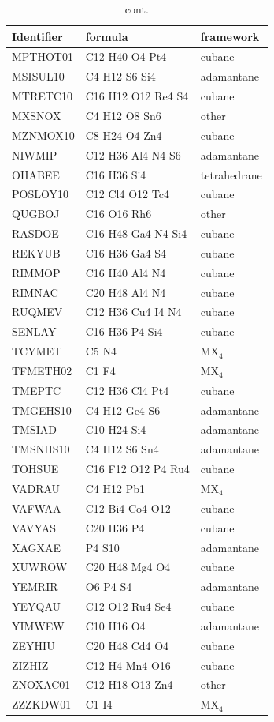 \documentclass[preprint]{revtex4}              %
\begin{document}
\begin{table}
\caption{cont.}\tiny
\begin{tabular}{lll}
Identifier & formula & framework\\
\hline
MPTHOT01 & C12 H40 O4 Pt4 & cubane \\
MSISUL10 & C4 H12 S6 Si4 & adamantane\\
MTRETC10 & C16 H12 O12 Re4 S4 & cubane\\
MXSNOX & C4 H12 O8 Sn6 & other\\
MZNMOX10 & C8 H24 O4 Zn4 & cubane\\
NIWMIP & C12 H36 Al4 N4 S6 & adamantane\\
OHABEE & C16 H36 Si4 & tetrahedrane\\
POSLOY10 & C12 Cl4 O12 Tc4 & cubane\\
QUGBOJ & C16 O16 Rh6 & other\\
RASDOE & C16 H48 Ga4 N4 Si4 & cubane\\
REKYUB & C16 H36 Ga4 S4 & cubane\\
RIMMOP & C16 H40 Al4 N4 & cubane\\
RIMNAC & C20 H48 Al4 N4 & cubane\\
RUQMEV & C12 H36 Cu4 I4 N4 & cubane\\
SENLAY & C16 H36 P4 Si4 & cubane\\
TCYMET & C5 N4 & MX$_4$\\
TFMETH02 & C1 F4 & MX$_4$\\
TMEPTC & C12 H36 Cl4 Pt4 & cubane\\
TMGEHS10 & C4 H12 Ge4 S6 & adamantane\\
TMSIAD & C10 H24 Si4 & adamantane\\
TMSNHS10 & C4 H12 S6 Sn4 & adamantane\\
TOHSUE & C16 F12 O12 P4 Ru4 & cubane\\
VADRAU & C4 H12 Pb1 & MX$_4$\\
VAFWAA & C12 Bi4 Co4 O12 & cubane\\
VAVYAS & C20 H36 P4 & cubane\\
XAGXAE & P4 S10 & adamantane\\
XUWROW & C20 H48 Mg4 O4 & cubane\\
YEMRIR & O6 P4 S4 & adamantane\\
YEYQAU & C12 O12 Ru4 Se4 & cubane\\
YIMWEW & C10 H16 O4 & adamantane\\
ZEYHIU & C20 H48 Cd4 O4 & cubane\\
ZIZHIZ & C12 H4 Mn4 O16 & cubane\\
ZNOXAC01 & C12 H18 O13 Zn4 & other\\
ZZZKDW01 & C1 I4 & MX$_4$\\
\hline
\end{tabular}
\end{table}
\end{document}
